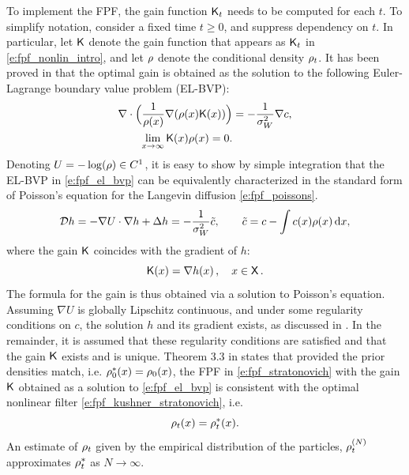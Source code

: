 To implement the FPF, the gain function $\text{\sf K}_t$ needs to be computed for each $t$. To simplify notation, consider a fixed time $t\ge 0$,  and suppress dependency on $t$.  In particular, let $\text{\sf K}$ denote the gain function that appears as  $ \text{\sf K}_t$  in \eqref{e:fpf_nonlin_intro},  and let $\rho$ denote the conditional density $\rho_t$. It has been proved in \cite{yanmehmey13} that the optimal gain is obtained as the solution to the following Euler-Lagrange boundary value problem (EL-BVP):
\begin{equation}
\begin{aligned}
\nabla \cdot \Bigl(\frac{1}{\pr(x)} \nabla (\pr(x) \kFPF(x))\Bigr) &= - \frac{1}{\sigma^2_W} \nabla c, \\
\lim_{x \to \infty} \kFPF(x) \pr(x) = 0.
\label{e:fpf_el_bvp}
\end{aligned}
\end{equation}%
Denoting $U=-\log(\rho)\in C^1$, it is easy to show by simple integration that the EL-BVP in \eqref{e:fpf_el_bvp} can be equivalently characterized in the standard form of Poisson's equation for the Langevin diffusion \eqref{e:fpf_poissons}.
\begin{equation}
\generate h = -\nabla \pot \cdot \nabla h + \Delta h  = -\frac{1}{\sigma_W^2}\tilc, \qquad \tilc = c - \int c(x) \pr(x)\, \ud x, 
\label{e:fpf_poissons}
\end{equation}
where the gain $\text{\sf K}$ coincides with the gradient of $h$:
\begin{equation}
\kFPF (x) = \nabla h(x)\, ,  \quad x\in\state\, .
\label{e:fpf_k_gradient}
\end{equation}
The formula for the gain is thus obtained via a solution to Poisson's equation.
Assuming $\nabla U$ is globally Lipschitz continuous, and under some regularity conditions on $c$, the solution $h$ and its gradient exists, as discussed in . In the remainder, it is assumed that these regularity conditions are satisfied and that the gain $\text{\sf K}$ exists and is unique. Theorem 3.3 in \cite{yanmehmey13} states that provided the prior densities match, i.e. $\rho^*_0(x) = \rho_0(x)$, the FPF in \eqref{e:fpf_stratonovich} with the gain $\text{\sf K}$ obtained as a solution to \eqref{e:fpf_el_bvp} is consistent with the optimal nonlinear filter \eqref{e:fpf_kushner_stratonovich}, i.e.
\begin{equation}
\rho_t(x) = \rho^*_t(x). 
\end{equation}
An estimate of $\rho_t$ given by the empirical distribution of the particles, $\rho^{(N)}_t$ approximates $\rho^*_t$ as $N \to \infty$. 
